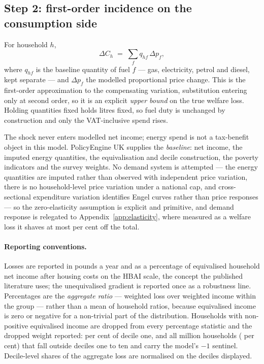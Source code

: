 \subsection{Step 2: first-order incidence on the consumption side}
\label{sec:step2}

For household $h$,
\begin{equation}
\label{eq:firstorder}
\Delta C_h \;=\; \sum_{f} q_{hf} \, \Delta p_{f},
\end{equation}
where $q_{hf}$ is the baseline quantity of fuel $f$ --- gas, electricity, petrol and diesel, kept separate --- and $\Delta p_f$ the modelled proportional price change. This is the \citet{deaton1980} first-order approximation to the compensating variation, substitution entering only at second order, so it is an explicit \emph{upper bound} on the true welfare loss. Holding quantities fixed holds litres fixed, so fuel duty is unchanged by construction and only the VAT-inclusive spend rises.

The shock never enters modelled net income; energy spend is not a tax-benefit object in this model. PolicyEngine UK supplies the \emph{baseline}: net income, the imputed energy quantities, the equivalisation and decile construction, the poverty indicators and the survey weights. No demand system is attempted --- the energy quantities are imputed rather than observed with independent price variation, there is no household-level price variation under a national cap, and cross-sectional expenditure variation identifies Engel curves rather than price responses --- so the zero-elasticity assumption is explicit and primitive, and demand response is relegated to Appendix~\ref{app:elasticity}, where measured as a welfare loss it shaves at most \genWelfareShavedHighEpsPct{} per cent off the total.

\paragraph{Reporting conventions.} Losses are reported in pounds a year and as a percentage of equivalised household net income after housing costs on the HBAI scale, the concept the published literature uses; the unequivalised gradient is reported once as a robustness line. Percentages are the \emph{aggregate ratio} --- weighted loss over weighted income within the group --- rather than a mean of household ratios, because equivalised income is zero or negative for a non-trivial part of the distribution. Households with non-positive equivalised income are dropped from every percentage statistic and the dropped weight reported: \genDecileOneZeroIncomeShare{} per cent of decile one, and all \genCoverageExcludedHouseholdsM{} million households (\genCoverageExcludedSharePct{} per cent) that fall outside deciles one to ten and carry the model's \(-1\) sentinel. Decile-level shares of the aggregate loss are normalised on the deciles displayed.

